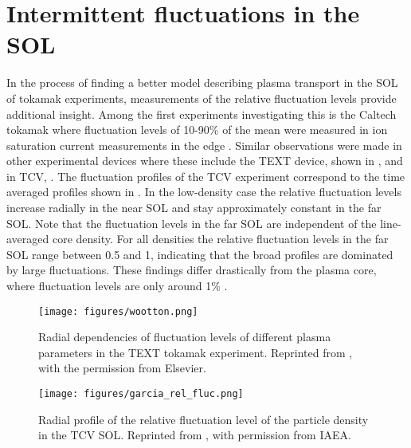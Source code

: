 \section{Intermittent fluctuations in the SOL}
In the process of finding a better model describing plasma transport in the SOL of tokamak experiments, measurements of the relative fluctuation levels provide additional insight. Among the first experiments investigating this is the Caltech tokamak where fluctuation levels of 10-90\% of the mean were measured in ion saturation current measurements in the edge \cite{zweben1982edge,zweben1983scaling}. Similar observations were made in other experimental devices where these include the TEXT device, shown in , and in TCV, . The fluctuation profiles of the TCV experiment correspond to the time averaged profiles shown in . In the low-density case the relative fluctuation levels increase radially in the near SOL and stay approximately constant in the far SOL. Note that the fluctuation levels in the far SOL are independent of the line-averaged core density. For all densities the relative fluctuation levels in the far SOL range between 0.5 and 1, indicating that the broad profiles are dominated by large fluctuations. These findings differ drastically from the plasma core, where fluctuation levels are only around 1\% \cite{mckee2007plasma}. 
\begin{figure}
	\centering
	\begin{minipage}{.48\linewidth}
		\texttt{[image: figures/wootton.png]}
	\caption{Radial dependencies of fluctuation levels of different plasma parameters in the TEXT tokamak experiment. Reprinted from \cite{wootton1990edge}, with the permission from Elsevier.}
	\label{Fig:wootton}
	\end{minipage}
	\hfill
	\begin{minipage}{.48\linewidth}
		\texttt{[image: figures/garcia\_rel\_fluc.png]}
	\caption{Radial profile of the relative fluctuation level of the particle density in the TCV SOL. Reprinted from \cite{garcia2007fluctuations}, with permission from IAEA.}
	\label{Fig:garcia_rel_fluc}
	\end{minipage}
\end{figure}

